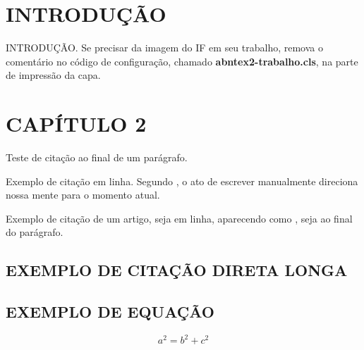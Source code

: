 \documentclass[
    12pt,				%
    a4paper,            %
    oneside,			%
    openright,			%
    ruledheader,
    anapcustomindent,
    sumario = tradicional,
    abntfigtabnum,
    tocpage=plain,
    english,			%
	brazil,				%
    ]{abntex-ifrn/abntex2-trabalho} %
\begin{document}
\renewcommand{\contentsname}{SUM\'ARIO} %
\pdfbookmark[0]{\contentsname}{toc}
\tableofcontents*
\cleardoublepage

\textual


\chapter{INTRODUÇÃO}
\thispagestyle{empty} %
    
    INTRODUÇÃO. Se precisar da imagem do IF em seu trabalho, remova o comentário no código de configuração, chamado \textbf{abntex2-trabalho.cls}, na parte de impressão da capa.
    

\chapter{CAPÍTULO 2}
    
    Teste de citação ao final de um parágrafo. \cite{monico_posicionamento_2007}
    
    Exemplo de citação em linha. Segundo \textcite{carroll_2018}, o ato de escrever manualmente direciona nossa mente para o momento atual.
    
    Exemplo de citação de um artigo, seja em linha, aparecendo como \textcite{silva_evolucao_2015}, seja ao final do parágrafo. \cite{silva_evolucao_2015}
    
    \section{EXEMPLO DE CITAÇÃO DIRETA LONGA}
    
    \begin{citacao}
    \lipsum[1]
    \end{citacao}
    
    
    \section{EXEMPLO DE EQUAÇÃO}
    \begin{equation}
        \label{eq:pitagoras}
        a^2 = b^2 + c^2
    \end{equation}
    
\end{document}
